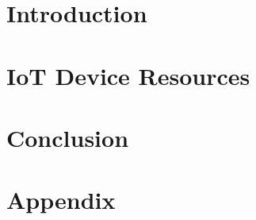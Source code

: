 \documentclass[a4paper 12pt]{article}
\begin{document}
\hypersetup{pageanchor=false}

\hypersetup{pageanchor=true}

\tableofcontents
\clearpage
\lstlistoflistings
\clearpage
\section{Introduction}

\section{IoT Device Resources}

\section{Conclusion}
\clearpage
\printbibliography
\appendix
\section{Appendix}
\end{document}

